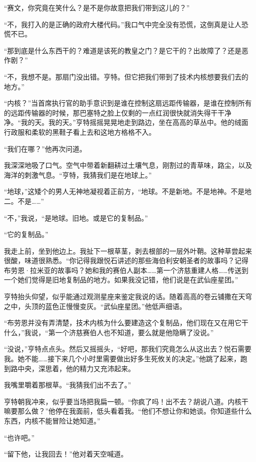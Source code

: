 \documentclass[AutoFakeBold=true]{book}
\begin{document}
``赛文，你究竟在笑什么？是不是你故意把我们带到这儿的？''

``不，我打入的是正确的政府大楼代码。''我口气中完全没有恐慌，这倒真是让人恐慌不已。

``那到底是什么东西干的？难道是该死的教皇之门？是它干的？出故障了？还是恶作剧？''

``不，我想不是。那扇门没出错。亨特。但它把我们带到了技术内核想要我们去的地方。''

``内核？''当首席执行官的助手意识到是谁在控制这扇远距传输器，是谁在控制{\kaishu 所有的}远距传输器的时候，那巴塞特之脸上仅剩的一点红润很快就消失得干干净净。``我的天。我的天。''亨特摇摇晃晃地走到路边，坐在高高的草丛中。他的绒面行政服和柔软的黑鞋子看上去和这地方格格不入。

``我们在哪？''他再次问道。

我深深地吸了口气。空气中带着新翻耕过土壤气息，刚割过的青草味，路尘，以及海洋的刺激气息。``亨特，我猜我们是在地球上。''

``地球，''这矮个的男人无神地凝视着正前方，``地球。不是新地。不是地神。不是地二。不是……''

``不，''我说，``是地球。旧地。或是它的复制品。''

``它的复制品。''

我走上前，坐到他边上。我扯下一根草茎，剥去根部的一层外叶鞘。这种草尝起来很酸，味道很熟悉。``你记得我跟悦石讲述的那些海伯利安朝圣者的故事吗？记得布劳恩·拉米亚的故事吗？她和我的赛伯人副本……第一个济慈重建人格……传送到一个她们觉得是旧地复制品的地方。如果我没记错，他们说是在武仙座星团。''

亨特抬头仰望，似乎能通过观测星座来鉴定我说的话。随着高高的卷云铺撒在天穹之中，头顶的蓝色正慢慢变灰。``武仙座星团。''他低声细语。

``布劳恩并没有弄清楚，技术内核为什么要建造这个复制品，他们现在又在用它干什么，''我说，``第一个济慈赛伯人也不知道，要么就是他隐瞒了没说。''

``没说，''亨特点点头。然后又摇摇头，``好吧，那我们究竟怎么从这出去？悦石需要我。她不能……接下来几个小时里需要做出好多生死攸关的决定。''他跳了起来，跑到路中央，深思着，他的精力又充沛起来。

我嘴里嚼着那根草。``我猜我们出不去了。''

亨特朝我冲来，似乎要当场把我扁一顿。``你疯了吗！出不去？胡说八道。内核干嘛要那么做？''他停在我面前，低头看着我。``他们不想让你和她谈。你知道些什么东西，内核不能冒险让她知道。''

``也许吧。''

``留下他，让我回去！''他对着天空喊道。
\end{document}
